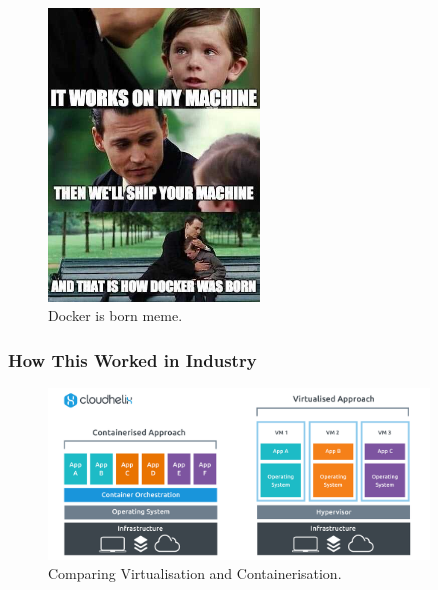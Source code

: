 \documentclass[aspectratio=169]{beamer}
\begin{document}
  \begin{frame}
    \begin{figure}[th!]
      \centering
      \includegraphics[width=0.5\textwidth]{docker-is-born-meme.jpg}
      \caption{Docker is born meme.}
      \label{fig:docker_born}
    \end{figure}
  \end{frame}

  \begin{frame}
    \frametitle{How This Worked in Industry}
    \begin{figure}[th!]
      \centering
      \includegraphics[width=0.9\textwidth]{containerisation.png}
      \caption{Comparing Virtualisation and Containerisation.}
      \label{fig:containerisation}
    \end{figure}
  \end{frame}
\end{document}
